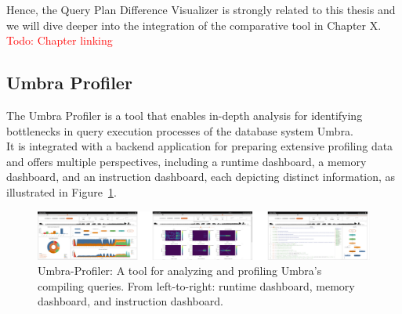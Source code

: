 Hence, the Query Plan Difference Visualizer is strongly related to this thesis and we will dive deeper into the integration of the comparative tool in Chapter X. \textcolor{red}{Todo: Chapter linking}



\subsection{Umbra Profiler}
The Umbra Profiler is a tool that enables in-depth analysis for identifying bottlenecks in query execution processes of the database system Umbra.
\\ It is integrated with a backend application for preparing extensive profiling data and offers multiple perspectives, including a runtime dashboard, a memory dashboard, and an instruction dashboard, each depicting distinct information, as illustrated in Figure~\ref{fig:umbra-profiler}.

\begin{figure}[h]
  \centering
  \includegraphics[width=1\linewidth]{figures/umbra-profiler.png}
  \caption{Umbra-Profiler: A tool for analyzing and profiling Umbra’s compiling queries. From left-to-right: runtime dashboard, memory dashboard, and instruction dashboard.}
  \label{fig:umbra-profiler}
\end{figure}

